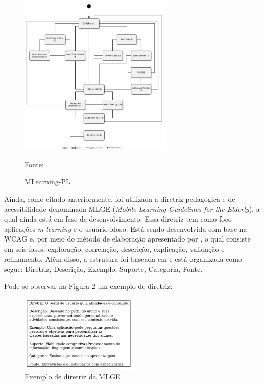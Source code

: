 \begin{figure}[H]
\centering
    \caption{MLearning-PL}
    \label{fig:ml-pl}
    \includegraphics[width=0.65\textwidth]{Figuras/mlearning-pl.png}
    
    Fonte: \cite{Fioravanti2017_plop}
\end{figure}

Ainda, como citado anteriormente, foi utilizada a diretriz pedagógica e de acessibilidade denominada MLGE (\textit{Mobile Learning Guidelines for the Elderly}), a qual ainda está em fase de desenvolvimento. Essa diretriz tem como foco aplicações \textit{m-learning} e o usuário idoso. Está sendo desenvolvida com base na WCAG e, por meio do método de elaboração apresentado por \cite{rusu2011}, o qual consiste em seis fases: exploração, correlação, descrição, explicação, validação e refinamento. Além disso, a estrutura foi baseada em \cite{baranauskas2003} e está organizada como segue: Diretriz, Descrição, Exemplo, Suporte, Categoria, Fonte.

Pode-se observar na Figura \ref{fig:mlge} um exemplo de diretriz:

\begin{figure}[H]
\centering
    \caption{Exemplo de diretriz da MLGE}
    \label{fig:mlge}
    \includegraphics[width=0.5\textwidth]{Figuras/MLGE-Exemplo.png}
\end{figure}


